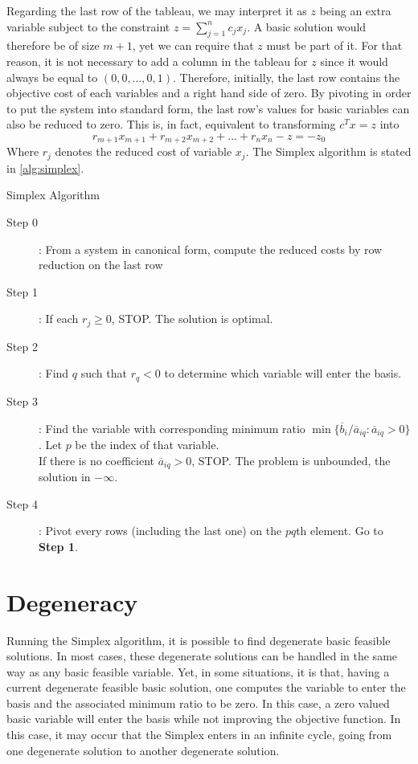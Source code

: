 Regarding the last row of the tableau, we may interpret it as $z$ being an extra variable subject to the constraint $z = \sum_{j=1}^n c_jx_j$. A basic solution would therefore be of size $m+1$, yet we can require that $z$ must be part of it. For that reason, it is not necessary to add a column in the tableau for $z$ since it would always be equal to $(0,0,...,0,1)$. Therefore, initially, the last row contains the objective cost of each variables and a right hand side of zero. By pivoting in order to put the system into standard form, the last row's values for basic variables can also be reduced to zero. This is, in fact, equivalent to transforming $c^Tx = z$ into \[ r_{m+1}x_{m+1} + r_{m+2}x_{m+2} + ... + r_nx_n - z = -z_0 \] Where $r_j$ denotes the reduced cost of variable $x_j$. The Simplex algorithm is stated in \ref{alg:simplex}. 

\begin{algorithm}[h!]
    \caption{Simplex Algorithm}
    \label{alg:simplex}
    \begin{description}
        \item[Step 0] : From a system in canonical form, compute the reduced costs by row reduction on the last row
        \item[Step 1] : If each $r_j \ge 0$, STOP. The solution is optimal.
        \item[Step 2] : Find $q$ such that $r_q < 0$ to determine which variable will enter the basis.
        \item[Step 3] : Find the variable with corresponding minimum ratio $\min\{ \overline b_i/\overline a_{iq} : \overline a_{iq} > 0 \}$. Let $p$ be the index of that variable.\\
        If there is no coefficient $\overline a_{iq} > 0$, STOP. The problem is unbounded, the solution in $-\infty$.
        \item[Step 4] : Pivot every rows (including the last one) on the $pq$th element. Go to \textbf{Step 1}.
    \end{description}
\end{algorithm}


\section{Degeneracy}

Running the Simplex algorithm, it is possible to find degenerate basic feasible solutions. In most cases, these degenerate solutions can be handled in the same way as any basic feasible variable. Yet, in some situations, it is that, having a current degenerate feasible basic solution, one computes the variable to enter the basis and the associated minimum ratio to be zero. In this case, a zero valued basic variable will enter the basis while not improving the objective function. In this case, it may occur that the Simplex enters in an infinite cycle, going from one degenerate solution to another degenerate solution. 

